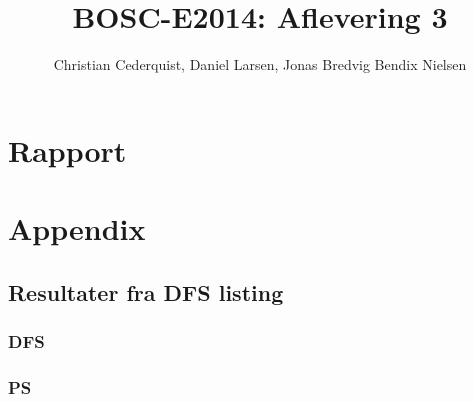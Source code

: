 \documentclass[oneside]{report}
\title{BOSC-E2014: Aflevering 3}
\author{Christian Cederquist, Daniel Larsen, Jonas Bredvig Bendix Nielsen }
\begin{document}
\maketitle
\tableofcontents

\part{Rapport}








\part{Appendix}
\appendix

\chapter{Resultater fra DFS listing}
\label{ResultaterDFS}
\section{DFS}


\section{PS}



\end{document}
